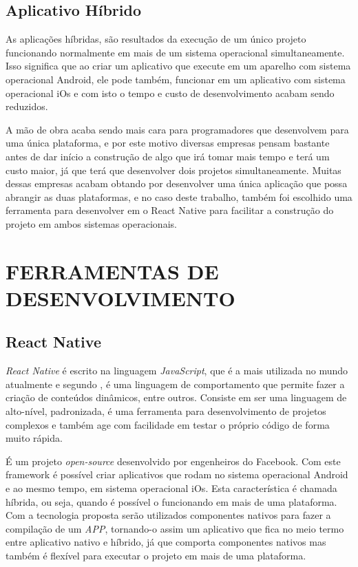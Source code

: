 \subsection{Aplicativo Híbrido}
As aplicações híbridas, são resultados da execução de um único projeto funcionando normalmente em mais de um sistema operacional simultaneamente. Isso significa que ao criar um aplicativo que execute em um aparelho com sistema operacional Android, ele pode também, funcionar em um aplicativo com sistema operacional iOs e com isto o tempo e custo de desenvolvimento acabam sendo reduzidos.

A mão de obra acaba sendo mais cara para programadores que desenvolvem para uma única plataforma, e por este motivo diversas empresas pensam bastante antes de dar início a construção de algo que irá tomar mais tempo e terá um custo maior, já que terá que desenvolver dois projetos simultaneamente. Muitas dessas empresas acabam obtando por desenvolver uma única aplicação que possa abrangir as duas plataformas, e no caso deste trabalho, também foi escolhido uma ferramenta para desenvolver em o React Native para facilitar a construção do projeto em ambos sistemas operacionais. 


\section{FERRAMENTAS DE DESENVOLVIMENTO}

\subsection{React Native}
\textit{React Native} é escrito na linguagem \textit{JavaScript}, que é a mais utilizada no mundo atualmente e segundo , é uma linguagem de comportamento que permite fazer a criação de conteúdos dinâmicos, entre outros. Consiste em ser uma linguagem de alto-nível, padronizada, é uma ferramenta para desenvolvimento de projetos complexos e também age com facilidade em testar o próprio código de forma muito rápida. 


É um projeto \textit{open-source} desenvolvido por engenheiros do Facebook. Com este framework é possível criar aplicativos que rodam no sistema operacional Android e ao mesmo tempo, em sistema operacional iOs. Esta característica é chamada híbrida, ou seja, quando é possível o funcionando em mais de uma plataforma. Com a tecnologia proposta serão utilizados componentes nativos para fazer a compilação de um \textit{APP}, tornando-o assim um aplicativo que fica no meio termo entre aplicativo nativo e híbrido, já que comporta componentes nativos mas também é flexível para executar o projeto em mais de uma plataforma.


